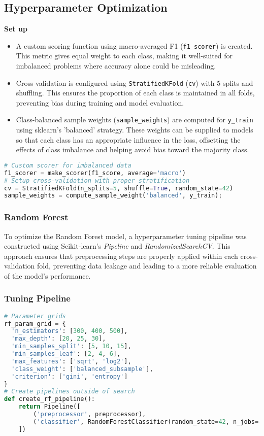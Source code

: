\documentclass[twoside,final]{hcmut-report}
\begin{document}
\subsection{Hyperparameter Optimization}
\textbf{Set up}
\begin{itemize}[itemsep=0pt, topsep=0pt, label=---]
  \item A custom scoring function using macro-averaged F1 (\texttt{f1\_scorer}) is created. This metric gives equal weight to each class, making it well-suited for imbalanced problems where accuracy alone could be misleading.
  \item Cross-validation is configured using \texttt{StratifiedKFold} (\texttt{cv}) with 5 splits and shuffling. This ensures the proportion of each class is maintained in all folds, preventing bias during training and model evaluation.
  \item Class-balanced sample weights (\texttt{sample\_weights}) are computed for \texttt{y\_train} using sklearn's 'balanced' strategy. These weights can be supplied to models so that each class has an appropriate influence in the loss, offsetting the effects of class imbalance and helping avoid bias toward the majority class.
\end{itemize}
\begin{lstlisting}[language=python]
# Custom scorer for imbalanced data
f1_scorer = make_scorer(f1_score, average='macro')
# Setup cross-validation with proper stratification
cv = StratifiedKFold(n_splits=5, shuffle=True, random_state=42)
sample_weights = compute_sample_weight('balanced', y_train);
\end{lstlisting}

\subsubsection{Random Forest}
To optimize the Random Forest model, a hyperparameter tuning pipeline was constructed using Scikit-learn's \textit{Pipeline} and \textit{RandomizedSearchCV}. This approach ensures that preprocessing steps are properly applied within each cross-validation fold, preventing data leakage and leading to a more reliable evaluation of the model's performance.
\subsubsection*{Tuning Pipeline}
\begin{lstlisting}[language=python]
# Parameter grids
rf_param_grid = {
  'n_estimators': [300, 400, 500],
  'max_depth': [20, 25, 30],
  'min_samples_split': [5, 10, 15],
  'min_samples_leaf': [2, 4, 6],
  'max_features': ['sqrt', 'log2'],
  'class_weight': ['balanced_subsample'],
  'criterion': ['gini', 'entropy']
}
# Create pipelines outside of search
def create_rf_pipeline():
    return Pipeline([
        ('preprocessor', preprocessor),
        ('classifier', RandomForestClassifier(random_state=42, n_jobs=-1))
    ])
\end{lstlisting}
\end{document}
